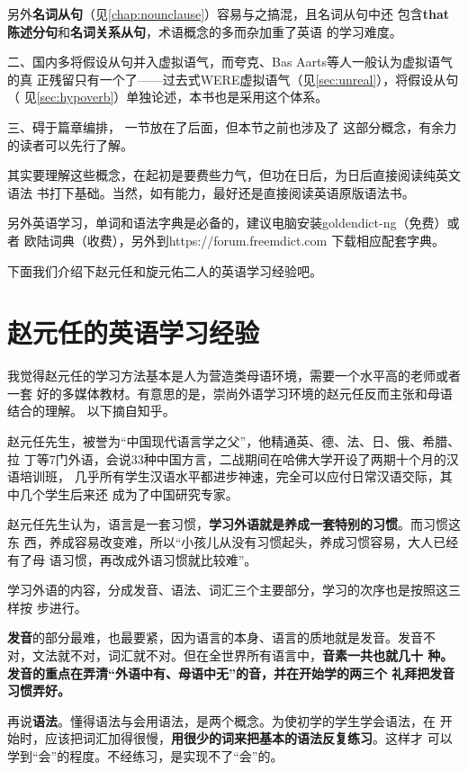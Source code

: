 另外\textbf{名词从句}（见\cref{chap:nounclause}）容易与之搞混，且名词从句中还
包含\textbf{that陈述分句}和\textbf{名词关系从句}，术语概念的多而杂加重了英语
的学习难度。

二、国内多将假设从句并入虚拟语气，而夸克、Bas Aarts等人一般认为虚拟语气的真
正残留只有一个了——过去式WERE虚拟语气（见\cref{sec:unreal}），将假设从句（
见\cref{sec:hypoverb}）单独论述，本书也是采用这个体系。

三、碍于篇章编排， 一节放在了后面，但本节之前也涉及了
这部分概念，有余力的读者可以先行了解。

其实要理解这些概念，在起初是要费些力气，但功在日后，为日后直接阅读纯英文语法
书打下基础。当然，如有能力，最好还是直接阅读英语原版语法书。


另外英语学习，单词和语法字典是必备的，建议电脑安装goldendict-ng（免费）或者
欧陆词典（收费），另外到https://forum.freemdict.com 下载相应配套字典。

下面我们介绍下赵元任和旋元佑二人的英语学习经验吧。


\section*{赵元任的英语学习经验}

我觉得赵元任的学习方法基本是人为营造类母语环境，需要一个水平高的老师或者一套
好的多媒体教材。有意思的是，崇尚外语学习环境的赵元任反而主张和母语结合的理解。
以下摘自知乎。

赵元任先生，被誉为“中国现代语言学之父”，他精通英、德、法、日、俄、希腊、拉
丁等7门外语，会说33种中国方言，二战期间在哈佛大学开设了两期十个月的汉语培训班，
几乎所有学生汉语水平都进步神速，完全可以应付日常汉语交际，其中几个学生后来还
成为了中国研究专家。

赵元任先生认为，语言是一套习惯，\textbf{学习外语就是养成一套特别的习惯}。而习惯这东
西，养成容易改变难，所以“小孩儿从没有习惯起头，养成习惯容易，大人已经有了母
语习惯，再改成外语习惯就比较难”。

学习外语的内容，分成发音、语法、词汇三个主要部分，学习的次序也是按照这三样按
步进行。

\textbf{发音}的部分最难，也最要紧，因为语言的本身、语言的质地就是发音。发音不
对，文法就不对，词汇就不对。但在全世界所有语言中，\textbf{音素一共也就几十
  种。}\textbf{发音的重点在弄清“外语中有、母语中无”的音，并在开始学的两三个
  礼拜把发音习惯弄好。}

再说\textbf{语法}。懂得语法与会用语法，是两个概念。为使初学的学生学会语法，在
开始时，应该把词汇加得很慢，\textbf{用很少的词来把基本的语法反复练习}。这样才
可以学到“会”的程度。不经练习，是实现不了“会”的。

